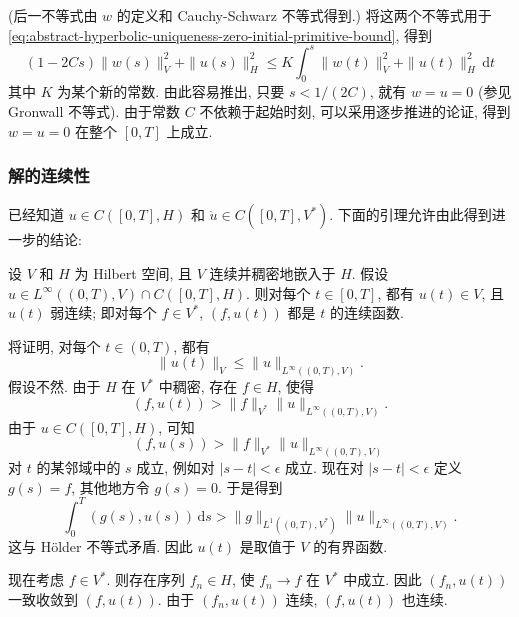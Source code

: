 (后一不等式由 $w$ 的定义和 Cauchy-Schwarz 不等式得到.) 将这两个不等式用于 \eqref{eq:abstract-hyperbolic-uniqueness-zero-initial-primitive-bound}, 得到
\begin{equation}\label{eq:abstract-hyperbolic-uniqueness-stepping-gronwall-bound}
(1-2Cs)\|w(s)\|_V^2+\|u(s)\|_H^2\leq K\int_0^s\|w(t)\|_V^2+\|u(t)\|_H^2\,\mathrm{d}t
\end{equation}
其中 $K$ 为某个新的常数. 由此容易推出, 只要 $s<1/(2C)$, 就有 $w=u=0$ (参见 Gronwall 不等式). 由于常数 $C$ 不依赖于起始时刻, 可以采用逐步推进的论证, 得到 $w=u=0$ 在整个 $[0,T]$ 上成立.

\subsubsection{解的连续性}\label{subsec:hyperbolic-solution-continuity}

已经知道 $u\in C([0,T],H)$ 和 $\dot u\in C([0,T],V^*)$. 下面的引理允许由此得到进一步的结论:

\begin{Lemma}
\label{lem:hilbert-triple-weak-continuity}
设 $V$ 和 $H$ 为 Hilbert 空间, 且 $V$ 连续并稠密地嵌入于 $H$. 假设 $u\in L^\infty((0,T),V)\cap C([0,T],H)$. 则对每个 $t\in[0,T]$, 都有 $u(t)\in V$, 且 $u(t)$ 弱连续; 即对每个 $f\in V^*$, $(f,u(t))$ 都是 $t$ 的连续函数.
\end{Lemma}

\begin{Proof}
将证明, 对每个 $t\in(0,T)$, 都有
\begin{equation}\label{eq:hilbert-triple-weak-continuity-pointwise-bound}
\|u(t)\|_V\leq\|u\|_{L^\infty((0,T),V)}.
\end{equation}
假设不然. 由于 $H$ 在 $V^*$ 中稠密, 存在 $f\in H$, 使得
\begin{equation}\label{eq:hilbert-triple-weak-continuity-separating-functional}
(f,u(t))>\|f\|_{V^*}\|u\|_{L^\infty((0,T),V)}.
\end{equation}
由于 $u\in C([0,T],H)$, 可知
\begin{equation}\label{eq:hilbert-triple-weak-continuity-neighborhood-separation}
(f,u(s))>\|f\|_{V^*}\|u\|_{L^\infty((0,T),V)}
\end{equation}
对 $t$ 的某邻域中的 $s$ 成立, 例如对 $|s-t|<\epsilon$ 成立. 现在对 $|s-t|<\epsilon$ 定义 $g(s)=f$, 其他地方令 $g(s)=0$. 于是得到
\begin{equation}\label{eq:hilbert-triple-weak-continuity-holder-contradiction}
\int_0^T(g(s),u(s))\,\mathrm{d}s>\|g\|_{L^1((0,T),V^*)}\|u\|_{L^\infty((0,T),V)}.
\end{equation}
这与 Hölder 不等式矛盾. 因此 $u(t)$ 是取值于 $V$ 的有界函数.\par 现在考虑 $f\in V^*$. 则存在序列 $f_n\in H$, 使 $f_n\to f$ 在 $V^*$ 中成立. 因此 $(f_n,u(t))$ 一致收敛到 $(f,u(t))$. 由于 $(f_n,u(t))$ 连续, $(f,u(t))$ 也连续.
\end{Proof}

